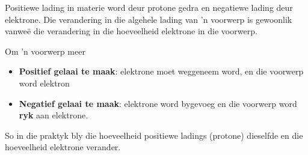 \par 

Positiewe lading in materie word deur protone gedra en negatiewe lading deur elektrone. Die verandering in die algehele lading van 'n voorwerp is gewoonlik vanwe\"e die verandering in die hoeveelheid elektrone in die voorwerp.

Om 'n voorwerp meer
      \begin{itemize}
        \item \textbf{Positief gelaai te maak}: elektrone moet weggeneem word, en die voorwerp word elektron 
        \item \textbf{Negatief gelaai te maak}: elektrone word bygevoeg en die voorwerp word \textbf{ryk} aan elektrone.
      \end{itemize}

So in die praktyk bly die hoeveelheid positiewe ladings (protone) dieselfde en die hoeveelheid elektrone verander.


